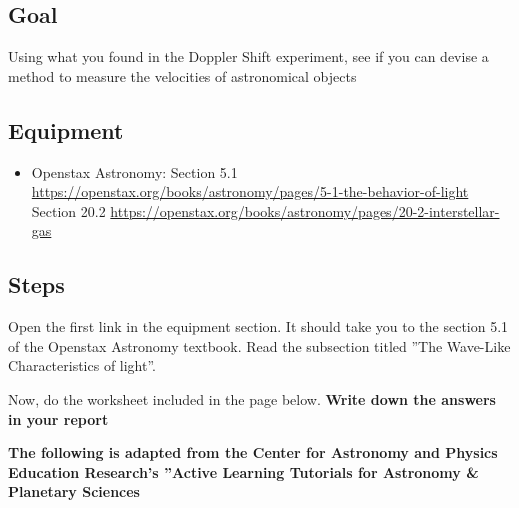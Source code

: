 \subsection{Goal}
Using what you found in the Doppler Shift experiment, see if you can devise a method to measure the velocities of astronomical objects

\subsection{Equipment}

\begin{itemize}
	\item Openstax Astronomy: Section 5.1 \url{https://openstax.org/books/astronomy/pages/5-1-the-behavior-of-light}
	Section 20.2 \url{https://openstax.org/books/astronomy/pages/20-2-interstellar-gas}
\end{itemize}

\subsection{Steps}


\begin{steps}
	\item Open the first link in the equipment section. It should take you to the section 5.1 of the Openstax Astronomy textbook. Read the subsection titled ''The Wave-Like Characteristics of light''. 
	
	\item Now, do the worksheet included in the page below. \textbf{Write down the answers in your report}
	
	\textbf{The following is adapted from the Center for Astronomy and Physics Education Research's ''Active Learning Tutorials for Astronomy & Planetary Sciences} %
\end{steps}
	


